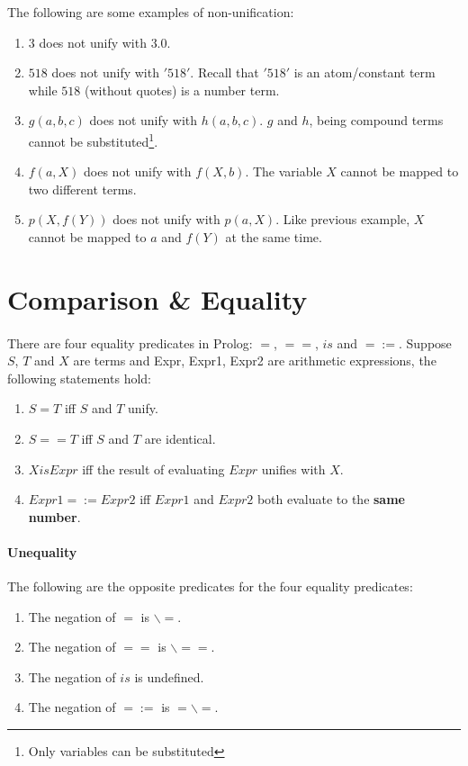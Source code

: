 \documentclass{article}
\begin{document}
\begin{multicols}{2}
  The following are some examples of non-unification:
  
  \begin{enumerate}
  \item $3$ does not unify with $3.0$.
  \item $518$ does not unify with $'518'$. Recall that $'518'$ is an atom/constant term while $518$ (without quotes) is a number term.
  \item $g(a, b, c)$ does not unify with $h(a, b, c)$. $g$ and $h$, being compound terms cannot be substituted\footnote{Only variables can be substituted}.
  \item $f(a, X)$ does not unify with $f(X, b)$. The variable $X$ cannot be mapped to two different terms.
  \item $p(X, f(Y))$ does not unify with $p(a, X)$. Like previous example, $X$ cannot be mapped to $a$ and $f(Y)$ at the same time.
  \end{enumerate}
  
  \section{Comparison \& Equality}
  
  \paragraph{} There are four equality predicates in Prolog: $=$, $==$, $is$ and $=:=$. Suppose $S$, $T$ and $X$ are terms and Expr, Expr1, Expr2 are arithmetic expressions, the following statements hold:
  
  \begin{enumerate}
  \item $S = T$ iff $S$ and $T$ unify.
  \item $S == T$ iff $S$ and $T$ are identical.
  \item $X is Expr$ iff the result of evaluating $Expr$ unifies with $X$.
  \item $Expr1 =:= Expr2$ iff $Expr1$ and $Expr2$ both evaluate to the {\bf same number}.
  \end{enumerate}
  
  \paragraph{Unequality} The following are the opposite predicates for the four equality predicates:
  
  \begin{enumerate}
  \item The negation of $=$ is $\backslash=$.
  \item The negation of $==$ is $\backslash==$.
  \item The negation of $is$ is undefined.
  \item The negation of $=:=$ is $=\backslash=$.
  \end{enumerate}
  

\end{multicols}
\end{document}
